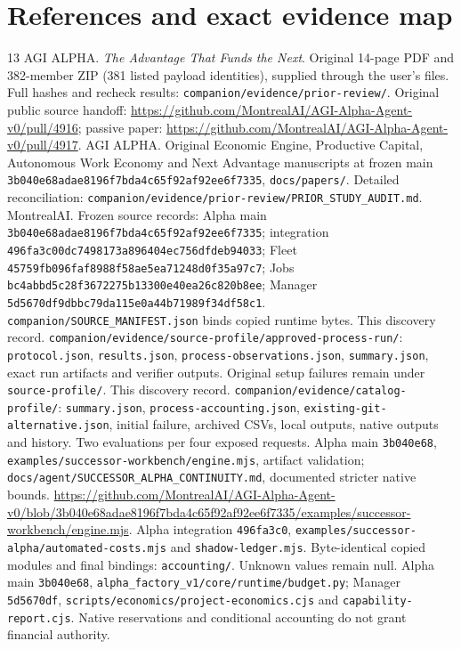 \documentclass[11pt,letterpaper]{article}
\newcommand{\code}[1]{{\small\nolinkurl{#1}}}
\newcommand{\sect}[1]{\section*{#1}}
\begin{document}
\clearpage
\sect{References and exact evidence map}
\begin{thebibliography}{13}\footnotesize
{} AGI ALPHA. \emph{The Advantage That Funds the Next}. Original 14-page PDF and 382-member ZIP (381 listed payload identities), supplied through the user's files. Full hashes and recheck results: \code{companion/evidence/prior-review/}. Original public source handoff: \url{https://github.com/MontrealAI/AGI-Alpha-Agent-v0/pull/4916}; passive paper: \url{https://github.com/MontrealAI/AGI-Alpha-Agent-v0/pull/4917}.
 AGI ALPHA. Original Economic Engine, Productive Capital, Autonomous Work Economy and Next Advantage manuscripts at frozen main \code{3b040e68adae8196f7bda4c65f92af92ee6f7335}, \code{docs/papers/}. Detailed reconciliation: \code{companion/evidence/prior-review/PRIOR_STUDY_AUDIT.md}.
 MontrealAI. Frozen source records: Alpha main \code{3b040e68adae8196f7bda4c65f92af92ee6f7335}; integration \code{496fa3c00dc7498173a896404ec756dfdeb94033}; Fleet \code{45759fb096faf8988f58ae5ea71248d0f35a97c7}; Jobs \code{bc4abbd5c28f3672275b13300e40ea26c820b8ee}; Manager \code{5d5670df9dbbc79da115e0a44b71989f34df58c1}. \code{companion/SOURCE_MANIFEST.json} binds copied runtime bytes.
 This discovery record. \code{companion/evidence/source-profile/approved-process-run/}: \code{protocol.json}, \code{results.json}, \code{process-observations.json}, \code{summary.json}, exact run artifacts and verifier outputs. Original setup failures remain under \code{source-profile/}.
 This discovery record. \code{companion/evidence/catalog-profile/}: \code{summary.json}, \code{process-accounting.json}, \code{existing-git-alternative.json}, initial failure, archived CSVs, local outputs, native outputs and history. Two evaluations per four exposed requests.
 Alpha main \code{3b040e68}, \code{examples/successor-workbench/engine.mjs}, artifact validation; \code{docs/agent/SUCCESSOR_ALPHA_CONTINUITY.md}, documented stricter native bounds. \url{https://github.com/MontrealAI/AGI-Alpha-Agent-v0/blob/3b040e68adae8196f7bda4c65f92af92ee6f7335/examples/successor-workbench/engine.mjs}.
 Alpha integration \code{496fa3c0}, \code{examples/successor-alpha/automated-costs.mjs} and \code{shadow-ledger.mjs}. Byte-identical copied modules and final bindings: \code{accounting/}. Unknown values remain null.
 Alpha main \code{3b040e68}, \code{alpha_factory_v1/core/runtime/budget.py}; Manager \code{5d5670df}, \code{scripts/economics/project-economics.cjs} and \code{capability-report.cjs}. Native reservations and conditional accounting do not grant financial authority.

\end{thebibliography}
\end{document}
